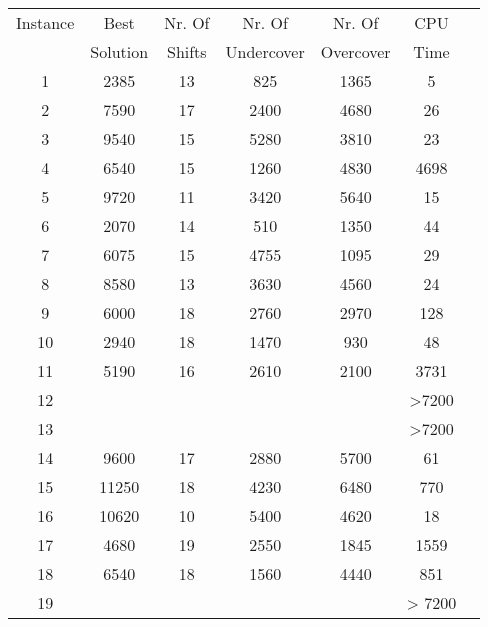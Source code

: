 \begin{table} \small
\centering
\begin{tabular}{ccccccc}
\hline
 Instance & Best & Nr. Of & Nr. Of  & Nr. Of   & CPU   \\
 & Solution & Shifts & Undercover & Overcover & Time  \\
\hline
1 &  2385	& 13 & 825 & 1365 & 5   \\

2 &  7590	& 17 & 2400 & 4680 & 26  \\

3 &  9540 	& 15 & 5280 & 3810 & 23    \\

4 &  6540	& 15 & 1260 & 4830 & 4698 \\

5 &  9720	& 11 & 3420 & 5640 & 15     \\

6 &  2070	& 14 & 510 & 1350 & 44  \\

7 &  6075	& 15 & 4755 & 1095 & 29    \\

8 &   8580	& 13 & 3630 & 4560 & 24  \\

9 &  6000	& 18 & 2760 & 2970 & 128  \\

10 &  2940	& 18 & 1470 & 930 & 48   \\

11 &  5190	& 16 & 2610 &2100 & 3731   \\

12 &  	&  &  &  & >7200  \\

13 &   	&  &  &  & >7200    \\

14 &  9600	& 17 & 2880 & 5700 & 61  \\

15 &  11250	& 18 & 4230 & 6480 & 770     \\

16 &  10620	& 10 & 5400 &  4620 & 18  \\

17 &  4680	& 19 & 2550 & 1845 & 1559   \\

18 &   6540	& 18 & 1560 & 4440 & 851  \\

19 &  	&  &  & & > 7200   \\


\end{tabular}
\end{table}

